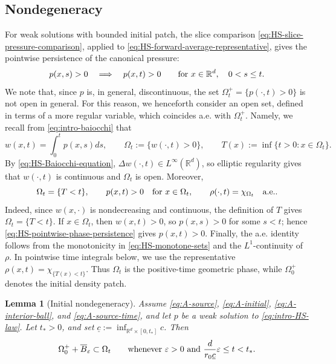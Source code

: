 \documentclass[11pt]{amsart}
\numberwithin{equation}{section}
\numberwithin{figure}{section}
\theoremstyle{plain}
\newtheorem{lem}[thm]{Lemma}
\theoremstyle{definition}
\theoremstyle{remark}
\theoremstyle{plain}
\newcommand{\vep}{\varepsilon}
\def\R{\mathbb{R}}
\begin{document}
\subsection{Nondegeneracy}
\label{subsec:HS-endpoint-nondegeneracy}

For weak solutions with bounded initial patch, the slice
comparison \eqref{eq:HS-slice-pressure-comparison}, applied to
\eqref{eq:HS-forward-average-representative}, gives the pointwise persistence
of the canonical pressure:
\begin{equation}\label{eq:HS-pointwise-phase-persistence}
    p(x,s)>0\quad\Longrightarrow\quad p(x,t)>0
    \qquad\hbox{for }x\in\R^d,\quad 0<s\leq t .
\end{equation}
We note that, since $p$ is, in general, discontinuous, the set $\Omega_t^{+}=\{p(\cdot,t)>0\}$ is not open in general. For this reason, we henceforth consider an open set, defined in terms of a more regular variable, which coincides a.e. with $\Omega_t^{+}$. Namely, we recall from \eqref{eq:intro-baiocchi} that
\begin{equation}\label{eq:HS-open-phase-bridge}
    w(x,t)=\int_{0}^tp(x,s)ds, \qquad \Omega_t:=\{w(\cdot,t)>0\},
    \qquad
    T(x):=\inf\{t>0:x\in\Omega_t\}.
\end{equation}
By \eqref{eq:HS-Baiocchi-equation}, $\Delta w(\cdot,t)\in L^\infty(\R^d)$, so elliptic regularity gives that $w(\cdot,t)$ is continuous and $\Omega_t$ is open. Moreover,
\begin{equation}\label{eq:HS-open-phase-identities}
    \Omega_t=\{T<t\},
    \qquad
    p(x,t)>0\quad\hbox{for }x\in\Omega_t,
    \qquad
    \rho(\cdot,t)=\chi_{\Omega_t}\quad\hbox{a.e.}.
\end{equation}
Indeed, since $w(x,\cdot)$ is nondecreasing and continuous, the definition of $T$ gives $\Omega_t=\{T<t\}$. If $x\in\Omega_t$, then $w(x,t)>0$, so $p(x,s)>0$ for some $s<t$; hence \eqref{eq:HS-pointwise-phase-persistence} gives $p(x,t)>0$. Finally, the a.e. identity follows from the monotonicity in \eqref{eq:HS-monotone-sets} and the $L^1$-continuity of $\rho$. In pointwise time
integrals below, we use the representative \(\rho(x,t)=\chi_{\{T(x)<t\}}\).
Thus \(\Omega_t\) is the positive-time geometric phase, while
\(\Omega_0^{+}\) denotes the initial density patch.

\begin{lem}[Initial nondegeneracy]\label{lem:HS-initial-nondegeneracy}
Assume \eqref{eq:A-source}, \eqref{eq:A-initial}, \eqref{eq:A-interior-ball}, and
\eqref{eq:A-source-time}, and let
\(p\) be a weak solution to \eqref{eq:intro-HS-law}.  Let \(t_*>0\), and set
\(\underline c:=\inf_{\R^d\times[0,t_*]}c\).
Then
\begin{equation}\label{eq:HS-initial-nondegeneracy}
    \Omega_0^{+}+\overline B_\vep\subset\Omega_t
    \qquad\hbox{whenever }\vep>0
    \hbox{ and } \frac{d}{r_0 \underline c}\vep\leq t<t_* .
\end{equation}
\end{lem}
\end{document}
